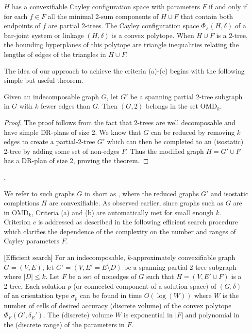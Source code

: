 \begin{theorem}\label{theorem:convexcayley}
    \uncited $H$ has a convexifiable Cayley configuration space  with
    parameters $F$ if and only if for each $f\in F$  all the minimal
    2-sum components of $H\cup F$ that contain both endpoints of $f$
    are partial 2-trees. The Cayley configuration space
    $\Phi_F(H,\delta)$ of a bar-joint system or linkage $(H,\delta)$
    is a convex polytope. When $H\cup F$ is a 2-tree, the bounding
    hyperplanes of this polytope are triangle inequalities relating
    the lengths of edges of the triangles in $H\cup F$.
\end{theorem}

The idea of our approach to achieve the criteria (a)-(c) begins with
the following simple but useful theorem.

\begin{theorem}\label{theorem:omdk}
    Given an indecomposable graph $G$, let $G'$ be a spanning partial
    2-tree subgraph in $G$ with $k$ fewer edges than $G$. Then
    $(G,2)$ belongs in the set OMD$_k$.
\end{theorem}

\begin{proof}
The proof follows from the fact that 2-trees are well decomposable and
have simple DR-plans of size 2. We know that $G$ can be reduced by
removing $k$ edges to create a partial-2-tree $G'$ which can then be
completed to an (isostatic) 2-tree by adding some set of non-edges
$F$. Thus the modified graph $H = G'\cup F$ has  a DR-plan of size 2,
proving the theorem.
\end{proof}.

We refer to such graphs $G$ in short as , where the reduced graphs $G'$ and isostatic
completions $H$ are convexifiable. As observed earlier, since graphs
such as $G$ are in OMD$_k$, Criteria (a) and (b) are automatically met
for small enough $k$. Criterion $c$ is addressed as described in the
following efficient search procedure which clarifies the dependence of
the complexity on the number and ranges  of Cayley parameters $F$.

\begin{theorem}\label{theorem:criterionc}
    [Efficient search]
    For an indecomposable, $k$-approximately convexifiable graph $G =
    (V,E)$, let $G' = (V,E' =E\setminus D)$ be a spanning partial
    2-tree subgraph where $|D| \le  k$. Let  $F$ be a set of nonedges
    of $G$ such that $H = (V, E'\cup F)$ is a 2-tree. Each solution
    $p$ (or connected component of a solution space) of $(G,\delta)$
    of an orientation type $\sigma_p$ can be found in time
    $O(\log(W))$ where $W$ is the number of cells of desired accuracy
    (discrete volume) of the convex polytope $\Phi_F(G',\delta_E')$.
    The (discrete) volume $W$ is exponential in $|F|$ and polynomial
    in the (discrete range) of the parameters in $F$.
\end{theorem}


